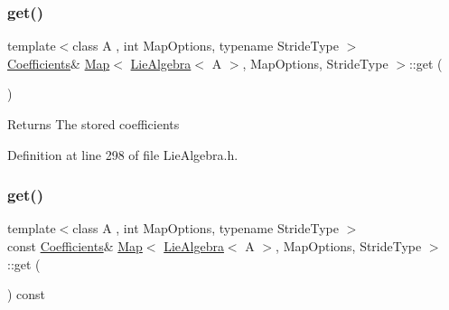 \subsubsection{\texorpdfstring{get()}{get()}\hspace{0.1cm}{\footnotesize\ttfamily [1/2]}}
{\footnotesize\ttfamily template$<$class A , int Map\+Options, typename Stride\+Type $>$ \\
\hyperlink{class_map_3_01_lie_algebra_3_01_a_01_4_00_01_map_options_00_01_stride_type_01_4_a32e1cab48693733071a98e9f558d4c82}{Coefficients}\& \hyperlink{class_map_3_01_lie_algebra_3_01_a_01_4_00_01_map_options_00_01_stride_type_01_4_a5e320dd14d4d47929d7a4d48014a735f}{Map}$<$ \hyperlink{class_lie_algebra}{Lie\+Algebra}$<$ A $>$, Map\+Options, Stride\+Type $>$\+::get (\begin{DoxyParamCaption}{ }\end{DoxyParamCaption})\hspace{0.3cm}{\ttfamily [inline]}}

\begin{DoxyReturn}{Returns}
The stored coefficients 
\end{DoxyReturn}


Definition at line 298 of file Lie\+Algebra.\+h.

\hypertarget{class_map_3_01_lie_algebra_3_01_a_01_4_00_01_map_options_00_01_stride_type_01_4_a01a271dce87d94d6fade1279d3f5686f}{}\label{class_map_3_01_lie_algebra_3_01_a_01_4_00_01_map_options_00_01_stride_type_01_4_a01a271dce87d94d6fade1279d3f5686f} 
\subsubsection{\texorpdfstring{get()}{get()}\hspace{0.1cm}{\footnotesize\ttfamily [2/2]}}
{\footnotesize\ttfamily template$<$class A , int Map\+Options, typename Stride\+Type $>$ \\
const \hyperlink{class_map_3_01_lie_algebra_3_01_a_01_4_00_01_map_options_00_01_stride_type_01_4_a32e1cab48693733071a98e9f558d4c82}{Coefficients}\& \hyperlink{class_map_3_01_lie_algebra_3_01_a_01_4_00_01_map_options_00_01_stride_type_01_4_a5e320dd14d4d47929d7a4d48014a735f}{Map}$<$ \hyperlink{class_lie_algebra}{Lie\+Algebra}$<$ A $>$, Map\+Options, Stride\+Type $>$\+::get (\begin{DoxyParamCaption}{ }\end{DoxyParamCaption}) const\hspace{0.3cm}{\ttfamily [inline]}}

